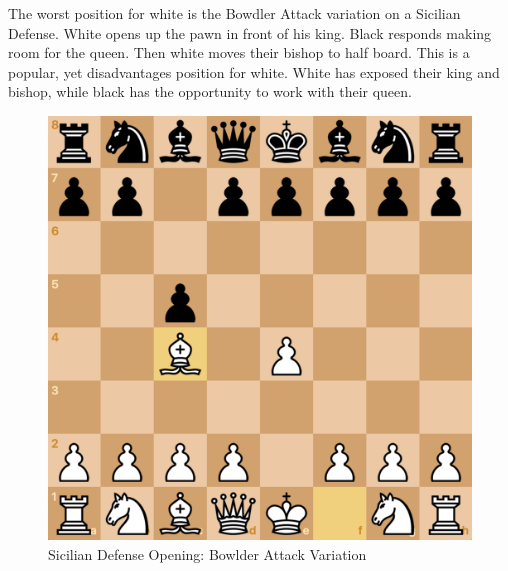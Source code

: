 \documentclass[reprint,
 amsmath,amssymb,nobibnotes,
 aps, floatfix]{revtex4-1}
\begin{document}
The worst position for white is the Bowdler Attack variation on a Sicilian Defense. White opens up the pawn in front of his king. Black responds making room for the queen. Then white moves their bishop to half board. This is a popular, yet disadvantages position for white. White has exposed their king and bishop, while black has the opportunity to work with their queen.

\begin{figure}[H]
    \centering
    \includegraphics[scale=.2]{bowlderattack.png}
    \caption{Sicilian Defense Opening: Bowlder Attack Variation}
    \label{fig:Bowlder}
\end{figure}
\end{document}
